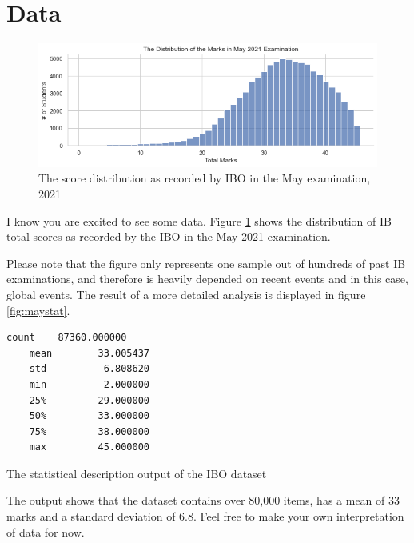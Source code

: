 \documentclass[a4paper,12pt]{tufte-handout}
\begin{document}
\section{Data}
\begin{figure}
    \centering
    \includegraphics[width=\textwidth]{assets/maydist.png}
    \caption{The score distribution as recorded by IBO in the May examination, 2021}
    \label{fig:ibo_total}
\end{figure}

I know you are excited to see some data. Figure \ref{fig:ibo_total} shows the distribution of IB total scores as recorded by the IBO in the May 2021 examination.

Please note that the figure only represents one sample out of hundreds of past IB examinations, and therefore is heavily depended on recent events and in this case, global events. The result of a more detailed analysis is displayed in figure \ref{fig:maystat}.

\begin{marginfigure}
    \begin{lstlisting}[language=bash]
    count    87360.000000
    mean        33.005437
    std          6.808620
    min          2.000000
    25%         29.000000
    50%         33.000000
    75%         38.000000
    max         45.000000
    \end{lstlisting}
    \caption{The statistical description output of the IBO dataset}
    \label{fig:maystat}
\end{marginfigure}

The output shows that the dataset contains over 80,000 items, has a mean of 33 marks and a standard deviation of 6.8. Feel free to make your own interpretation of data for now.
\end{document}
